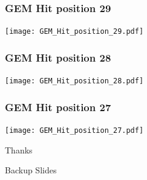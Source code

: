 \documentclass[slidestop,compress,mathserif]{beamer}
\begin{document}
\begin{frame}\frametitle{GEM Hit position 29}
	 \texttt{[image: GEM\_Hit\_position\_29.pdf]}
\end{frame}
\begin{frame}\frametitle{GEM Hit position 28}
	 \texttt{[image: GEM\_Hit\_position\_28.pdf]}
\end{frame}
\begin{frame}\frametitle{GEM Hit position 27}
	 \texttt{[image: GEM\_Hit\_position\_27.pdf]}
\end{frame}

\label{lastslide}
\begin{frame}[c]
	\begin{center}
	\Huge Thanks
	\end{center}
\end{frame}

\begin{frame}[c]
	\begin{center}
	\Huge Backup Slides
	\end{center}
\end{frame}
\end{document}
